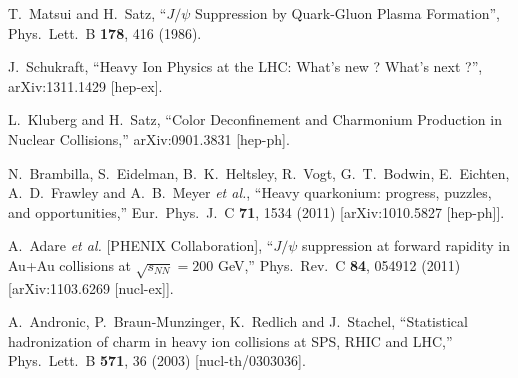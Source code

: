 \documentclass[aps,prc,preprint,superscriptaddress,showpacs,showkeys]{revtex4-1}
\begin{document}
\begin{thebibliography}{100}
\medskip
 T.~Matsui and H.~Satz,
 ``$J/\psi$ Suppression by Quark-Gluon Plasma Formation'',
 Phys.\ Lett.\ B {\bf 178}, 416 (1986).

  J.~Schukraft,
  ``Heavy Ion Physics at the LHC: What's new ? What's next ?'',
  arXiv:1311.1429 [hep-ex].

  L.~Kluberg and H.~Satz,
  ``Color Deconfinement and Charmonium Production in Nuclear Collisions,''
  arXiv:0901.3831 [hep-ph].

  N.~Brambilla, S.~Eidelman, B.~K.~Heltsley, R.~Vogt, G.~T.~Bodwin, E.~Eichten, A.~D.~Frawley and A.~B.~Meyer {\it et al.},
  ``Heavy quarkonium: progress, puzzles, and opportunities,''
  Eur.\ Phys.\ J.\ C {\bf 71}, 1534 (2011)
  [arXiv:1010.5827 [hep-ph]].


  A.~Adare {\it et al.}  [PHENIX Collaboration],
  ``$J/\psi$ suppression at forward rapidity in Au+Au collisions at $\sqrt{s_{NN}}=200$ GeV,''
  Phys.\ Rev.\ C {\bf 84}, 054912 (2011)
  [arXiv:1103.6269 [nucl-ex]].

  A.~Andronic, P.~Braun-Munzinger, K.~Redlich and J.~Stachel,
  ``Statistical hadronization of charm in heavy ion collisions at SPS, RHIC and LHC,''
  Phys.\ Lett.\ B {\bf 571}, 36 (2003)
  [nucl-th/0303036].


\end{thebibliography}
\end{document}
